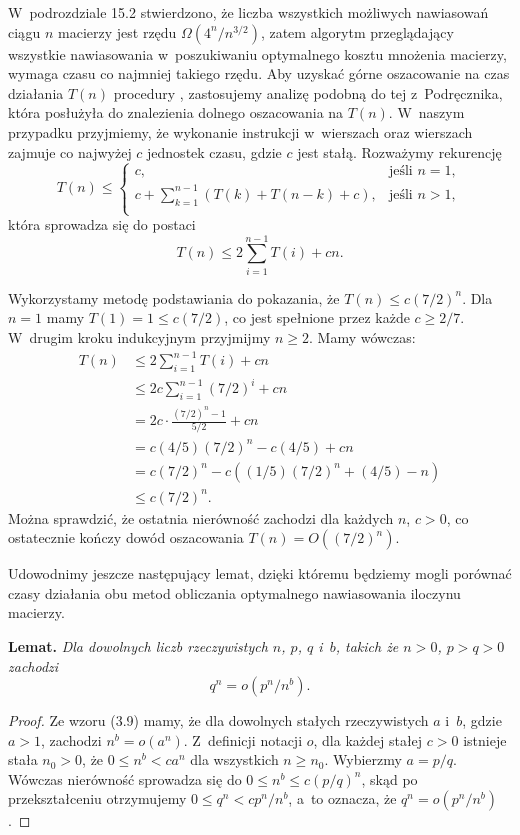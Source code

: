 
\exercise %
W~podrozdziale 15.2 stwierdzono, że liczba wszystkich możliwych nawiasowań ciągu $n$ macierzy jest rzędu $\Omega(4^n\!/n^{3/2})$, zatem algorytm przeglądający wszystkie nawiasowania w~poszukiwaniu optymalnego kosztu mnożenia macierzy, wymaga czasu co najmniej takiego rzędu.
Aby uzyskać górne oszacowanie na czas działania $T(n)$ procedury , zastosujemy analizę podobną do tej z~Podręcznika, która posłużyła do znalezienia dolnego oszacowania na $T(n)$.
W~naszym przypadku przyjmiemy, że wykonanie instrukcji w~wierszach  oraz wierszach  zajmuje co najwyżej $c$ jednostek czasu, gdzie $c$ jest stałą.
Rozważymy rekurencję
\[
	T(n) \le \begin{cases}
		c, & \text{jeśli $n=1$}, \\
		c+\sum_{k=1}^{n-1}(T(k)+T(n-k)+c), & \text{jeśli $n>1$}, \\
	\end{cases}
\]
która sprowadza się do postaci
\[
	T(n) \le 2\sum_{i=1}^{n-1}T(i)+cn.
\]

Wykorzystamy metodę podstawiania do pokazania, że $T(n)\le c(7/2)^n$.
Dla $n=1$ mamy $T(1)=1\le c(7/2)$, co jest spełnione przez każde $c\ge2/7$.
W~drugim kroku indukcyjnym przyjmijmy $n\ge2$.
Mamy wówczas:
\begin{align*}
	T(n) &\le 2\sum_{i=1}^{n-1}T(i)+cn \\
	&\le 2c\sum_{i=1}^{n-1}(7/2)^i+cn \\
	&= 2c\cdot\frac{(7/2)^n-1}{5/2}+cn \\
	&= c(4/5)(7/2)^n-c(4/5)+cn \\
	&= c(7/2)^n-c((1/5)(7/2)^n+(4/5)-n) \\
	&\le c(7/2)^n.
\end{align*}
Można sprawdzić, że ostatnia nierówność zachodzi dla każdych $n$, $c>0$, co ostatecznie kończy dowód oszacowania $T(n)=O((7/2)^n)$.

Udowodnimy jeszcze następujący lemat, dzięki któremu będziemy mogli porównać czasy działania obu metod obliczania optymalnego nawiasowania iloczynu macierzy.

\medskip
\noindent\textsf{\textbf{Lemat.}} \textit{Dla dowolnych liczb rzeczywistych\/ $n$, $p$, $q$ i\/~$b$, takich że\/ $n>0$,\/ $p>q>0$ zachodzi}
\[
	q^n = o(p^n\!/n^b).
\]
\begin{proof}
Ze wzoru (3.9) mamy, że dla dowolnych stałych rzeczywistych $a$ i~$b$, gdzie $a>1$, zachodzi $n^b=o(a^n)$.
Z~definicji notacji $o$, dla każdej stałej $c>0$ istnieje stała $n_0>0$, że $0\le n^b<ca^n$ dla wszystkich $n\ge n_0$.
Wybierzmy $a=p/q$.
Wówczas nierówność sprowadza się do $0\le n^b\le c(p/q)^n$, skąd po przekształceniu otrzymujemy $0\le q^n<cp^n\!/n^b$, a~to oznacza, że $q^n=o(p^n\!/n^b)$.
\end{proof}

